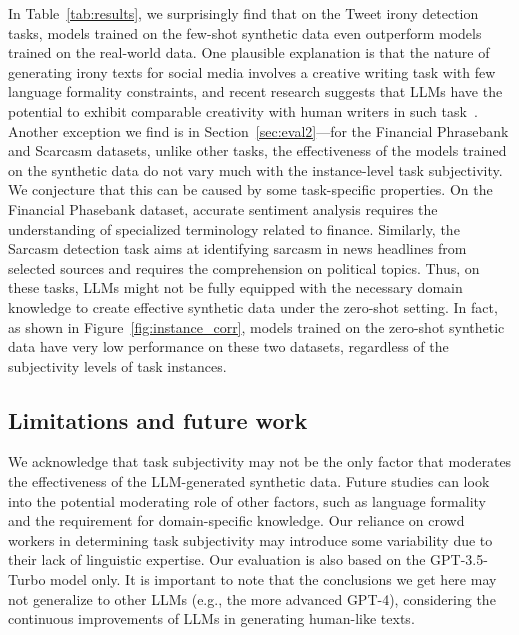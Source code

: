 In Table~\ref{tab:results}, we surprisingly find that on the Tweet irony detection tasks, models trained on the few-shot synthetic data even outperform models trained on the real-world data. One plausible explanation is that the nature of generating irony texts for social media involves a creative writing task with few language formality constraints, and recent research suggests that LLMs have
the potential to exhibit comparable creativity with human writers in such task~\cite{franceschelli2023creativity}. Another exception we find is in Section~\ref{sec:eval2}---for the Financial Phrasebank and Scarcasm datasets, unlike other tasks, the effectiveness of the models trained on the synthetic data do not vary much with the instance-level task subjectivity. 
We conjecture that this can be caused by some 
task-specific properties.
On the Financial Phasebank dataset, accurate sentiment analysis 
requires the understanding of specialized terminology related to finance. Similarly, the Sarcasm detection task aims at identifying sarcasm in news headlines from selected sources and requires the comprehension on political topics. Thus, on these tasks, LLMs might not be fully equipped with the necessary domain knowledge to create effective synthetic data under the zero-shot setting. In fact, as shown in Figure~\ref{fig:instance_corr}, models trained on the zero-shot synthetic data have very low performance on these two datasets, regardless of the subjectivity levels of task instances. 

\vspace{-4pt}
\subsection{Limitations and future work}

We acknowledge that task subjectivity may not be the only factor that moderates the effectiveness of the LLM-generated synthetic data. Future studies can look into the potential moderating role of other factors, such as language formality and the requirement for domain-specific knowledge.  Our reliance on crowd workers in determining task subjectivity may introduce some variability due to their lack of linguistic expertise. Our evaluation is also based on the GPT-3.5-Turbo model only. It is important to note that the conclusions we get here may not generalize to other LLMs (e.g., the more advanced GPT-4), considering the continuous improvements of LLMs in generating human-like texts.

